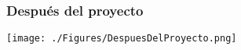 \begin{frame}
	\frametitle{Despu\'es del proyecto}
	\texttt{[image: ./Figures/DespuesDelProyecto.png]}
	
\end{frame}
